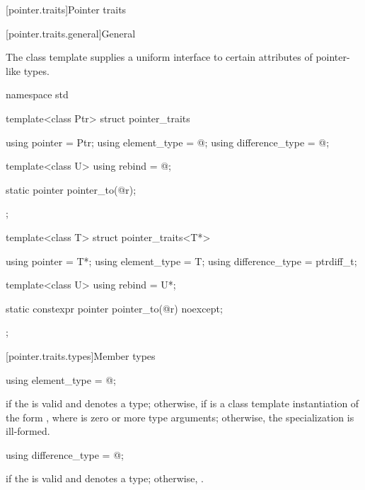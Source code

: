 [pointer.traits]{Pointer traits}

[pointer.traits.general]{General}

\pnum
The class template  supplies a uniform interface to certain
attributes of pointer-like types.

%
\begin{codeblock}
namespace std {
  template<class Ptr> struct pointer_traits {
    using pointer         = Ptr;
    using element_type    = @\seebelow@;
    using difference_type = @\seebelow@;

    template<class U> using rebind = @\seebelow@;

    static pointer pointer_to(@\seebelow@ r);
  };

  template<class T> struct pointer_traits<T*> {
    using pointer         = T*;
    using element_type    = T;
    using difference_type = ptrdiff_t;

    template<class U> using rebind = U*;

    static constexpr pointer pointer_to(@\seebelow@ r) noexcept;
  };
}
\end{codeblock}

[pointer.traits.types]{Member types}

%
\begin{itemdecl}
using element_type = @\seebelow@;
\end{itemdecl}

\begin{itemdescr}
\pnum
\ctype {} if
the   is valid and denotes a
type; otherwise,  if
 is a class template instantiation of the form ,
where  is zero or more type arguments; otherwise, the specialization is
ill-formed.
\end{itemdescr}

%
\begin{itemdecl}
using difference_type = @\seebelow@;
\end{itemdecl}

\begin{itemdescr}
\pnum
\ctype {} if
the   is valid and denotes a
type; otherwise,
.
\end{itemdescr}


